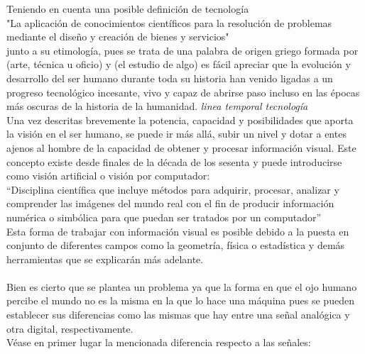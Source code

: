Teniendo en cuenta una posible definición de tecnología 
\\
"La aplicación de conocimientos científicos para la resolución de problemas mediante el diseño y creación de bienes y servicios" 
\\
junto a su etimología, pues se trata de una palabra de origen griego 
formada por 
(arte, técnica u oficio) y 
(el estudio de algo) es fácil apreciar que la evolución y desarrollo del ser humano durante toda su historia han venido ligadas a un progreso tecnológico incesante, vivo y capaz de abrirse paso incluso en las épocas más oscuras de la historia de la humanidad. 
\textit{linea temporal tecnología}
\\
Una vez descritas brevemente la potencia, capacidad y posibilidades que aporta la visión en el ser humano, se puede ir más allá, subir un nivel y dotar a entes ajenos al hombre de la capacidad de obtener y procesar información visual. Este concepto existe desde finales de la década de los sesenta y puede introducirse como visión artificial o visión por computador: 
\\
“Disciplina científica que incluye métodos para adquirir, procesar, analizar y comprender las imágenes del mundo real con el fin de producir información numérica o simbólica para que puedan ser tratados por un computador”
\\
Esta forma de trabajar con información visual es posible debido a la puesta en conjunto de diferentes campos como la geometría, física o estadística y demás herramientas que se explicarán más adelante.
\\
\\
Bien es cierto que se plantea un problema ya que la forma en que el ojo humano percibe el mundo no es la misma en la que lo hace una máquina pues se pueden establecer sus diferencias como las mismas que hay entre una señal analógica y otra digital, respectivamente.
\\
Véase en primer lugar la mencionada diferencia respecto a las señales:
\\
